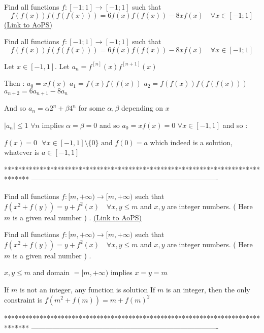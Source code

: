 \begin{problem}
	Find all functions $f:[-1;1] \to [-1;1]$ such that \[f(f(x))f(f(f(x))) = 6f(x)f(f(x)) - 8xf(x) \quad \forall x \in[-1;1]\]
	\flushright \href{https://artofproblemsolving.com/community/c6h581254}{(Link to AoPS)}
\end{problem}



\begin{solution}
	\begin{tcolorbox}Find all functions $f:[-1;1] \to [-1;1]$ such that \[f(f(x))f(f(f(x))) = 6f(x)f(f(x)) - 8xf(x) \quad \forall x \in[-1;1]\]\end{tcolorbox}
Let $x\in[-1,1]$. Let $a_n=f^{[n]}(x)f^{[n+1]}(x)$

Then :
$a_0=xf(x)$
$a_1=f(x)f(f(x))$
$a_2=f(f(x))f(f(f(x)))$
$a_{n+2}=6a_{n+1}-8a_n$

And so $a_n=\alpha 2^n+\beta 4^n$ for some $\alpha,\beta$ depending on $x$

$|a_n|\le 1$ $\forall n$ implies $\alpha=\beta=0$ and so $a_0=xf(x)=0$ $\forall x\in[-1,1]$ and so :

$\boxed{f(x)=0\text{  }\forall x\in[-1,1]\setminus\{0\}\text{  and  }f(0)=a}$ which indeed is a solution, whatever is $a\in[-1,1]$
\end{solution}
*******************************************************************************
-------------------------------------------------------------------------------

\begin{problem}
	Find  all functions $f: [m,+\infty ) \to  [m,+\infty )$  such that $f(x^{2}+f(y) ) =y+f^{2}(x)\quad \forall x, y \leq m$ and $x,y$ are integer numbers.
( Here $m$  is a given real number ) .
	\flushright \href{https://artofproblemsolving.com/community/c6h581257}{(Link to AoPS)}
\end{problem}



\begin{solution}
	\begin{tcolorbox}Find  all functions $f: [m,+\infty ) \to  [m,+\infty )$  such that $f(x^{2}+f(y) ) =y+f^{2}(x)\quad \forall x, y \leq m$ and $x,y$ are integer numbers.
( Here $m$  is a given real number ) .\end{tcolorbox}
$x,y\le m$ and domain  $=[m,+\infty)$ implies $x=y=m$

If $m$ is not an integer, any function is solution
If $m$ is an integer, then the only constraint is $f(m^2+f(m))=m+f(m)^2$
\end{solution}
*******************************************************************************
-------------------------------------------------------------------------------

